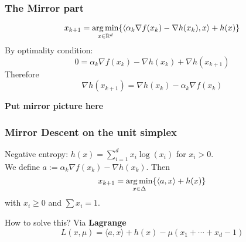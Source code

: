 \documentclass{beamer}
\begin{document}
\begin{frame}
  \frametitle{The Mirror part}
  \begin{equation}
    x_{k+1} = \operatorname*{arg\,min}_{x\in \mathbb{R}^d} \{ \langle \alpha_k \nabla f(x_k) - \nabla h(x_k), x \rangle + h(x) \}
  \end{equation}
  By optimality condition:
  \begin{equation}
    0 = \alpha_k \nabla f(x_k) - \nabla h(x_k) + \nabla h(x_{k+1})
  \end{equation}
  Therefore
  \begin{equation}
    \nabla h(x_{k+1}) =  \nabla h(x_k)  - \alpha_k \nabla f(x_k)
  \end{equation}

  \textbf{Put mirror picture here}

\end{frame}


\begin{frame}
  \frametitle{Mirror Descent on the unit simplex}
    Negative entropy: $h(x) = \sum_{i=1}^{d} x_i \log(x_i)$ for $ x_i > 0$. \\
    We define $a := \alpha_k \nabla f(x_k) - \nabla h(x_k)$. Then
    \begin{equation}
      x_{k+1} = \operatorname*{arg\,min}_{x \in \Delta} \{ \langle a, x \rangle + h(x)\}
    \end{equation}
    with $x_i \ge 0$ and $\sum x_i = 1$.
    \begin{block}{How to solve this?}
      Via \textbf{Lagrange }
      \begin{equation}
        L(x,\mu) = \langle a, x \rangle + h(x) - \mu (x_1+\cdots+ x_d -1)
      \end{equation}
    \end{block}
\end{frame}
\end{document}
